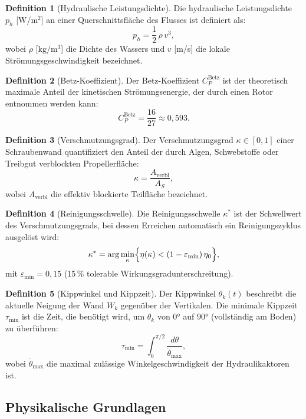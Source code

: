 ﻿\documentclass[a4paper,12pt]{article}
\theoremstyle{definition}
\newtheorem{definition}{Definition}
\begin{document}
\begin{definition}[Hydraulische Leistungsdichte]
Die hydraulische Leistungsdichte $p_h$ [W/m$^2$] an einer Querschnittsfläche des
Flusses ist definiert als:
\[
  p_h = \frac{1}{2}\,\rho\,v^3,
\]
wobei $\rho$ [$\mathrm{kg/m^3}$] die Dichte des Wassers und $v$ [m/s] die lokale
Strömungsgeschwindigkeit bezeichnet.
\end{definition}

\begin{definition}[Betz-Koeffizient]
Der Betz-Koeffizient $C_P^{\mathrm{Betz}}$ ist der theoretisch maximale Anteil der
kinetischen Strömungsenergie, der durch einen Rotor entnommen werden kann:
\[
  C_P^{\mathrm{Betz}} = \frac{16}{27} \approx 0{,}593.
\]
\end{definition}

\begin{definition}[Verschmutzungsgrad]
Der Verschmutzungsgrad $\kappa \in [0, 1]$ einer Schraubenwand quantifiziert den Anteil
der durch Algen, Schwebstoffe oder Treibgut verblockten Propellerfläche:
\[
  \kappa = \frac{A_{\mathrm{verbl}}}{A_S},
\]
wobei $A_{\mathrm{verbl}}$ die effektiv blockierte Teilfläche bezeichnet.
\end{definition}

\begin{definition}[Reinigungsschwelle]
Die Reinigungsschwelle $\kappa^*$ ist der Schwellwert des Verschmutzungsgrads, bei
dessen Erreichen automatisch ein Reinigungszyklus ausgelöst wird:
\[
  \kappa^* = \arg\min_{\kappa} \Bigl\{\eta(\kappa) < (1 - \varepsilon_{\mathrm{min}})\,\eta_0\Bigr\},
\]
mit $\varepsilon_{\mathrm{min}} = 0{,}15$ (15\,\% tolerable Wirkungsgradunterschreitung).
\end{definition}

\begin{definition}[Kippwinkel und Kippzeit]
Der Kippwinkel $\theta_k(t)$ beschreibt die aktuelle Neigung der Wand $W_k$ gegenüber
der Vertikalen. Die minimale Kippzeit $\tau_{\mathrm{min}}$ ist die Zeit, die benötigt wird,
um $\theta_k$ von $0 °$ auf $90 °$ (vollständig am Boden) zu überführen:
\[
  \tau_{\mathrm{min}} = \int_0^{\pi/2} \frac{d\theta}{\dot{\theta}_{\mathrm{max}}},
\]
wobei $\dot{\theta}_{\mathrm{max}}$ die maximal zulässige Winkelgeschwindigkeit der
Hydraulikaktoren ist.
\end{definition}

\subsection{Physikalische Grundlagen}
\end{document}
